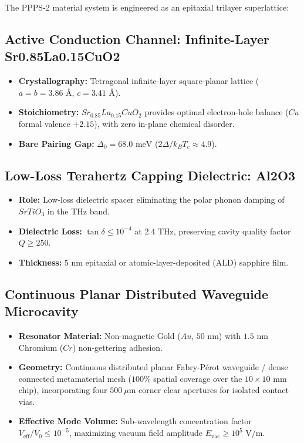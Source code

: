 \documentclass[10pt,twocolumn,letterpaper]{article}
\begin{document}
The PPPS-2 material system is engineered as an epitaxial trilayer superlattice:

\subsection{Active Conduction Channel: Infinite-Layer Sr0.85La0.15CuO2}
\begin{itemize}
    \item \textbf{Crystallography:} Tetragonal infinite-layer square-planar lattice ($a = b = 3.86\text{ \AA}$, $c = 3.41\text{ \AA}$).
    \item \textbf{Stoichiometry:} $Sr_{0.85}La_{0.15}CuO_2$ provides optimal electron-hole balance ($Cu$ formal valence $+2.15$), with zero in-plane chemical disorder.
    \item \textbf{Bare Pairing Gap:} $\Delta_0 = 68.0\text{ meV}$ ($2\Delta / k_B T_c \approx 4.9$).
\end{itemize}

\subsection{Low-Loss Terahertz Capping Dielectric: Al2O3}
\begin{itemize}
    \item \textbf{Role:} Low-loss dielectric spacer eliminating the polar phonon damping of $SrTiO_3$ in the THz band.
    \item \textbf{Dielectric Loss:} $\tan \delta \le 10^{-4}$ at $2.4\text{ THz}$, preserving cavity quality factor $Q \ge 250$.
    \item \textbf{Thickness:} $5\text{ nm}$ epitaxial or atomic-layer-deposited (ALD) sapphire film.
\end{itemize}

\subsection{Continuous Planar Distributed Waveguide Microcavity}
\begin{itemize}
    \item \textbf{Resonator Material:} Non-magnetic Gold ($Au$, $50\text{ nm}$) with $1.5\text{ nm}$ Chromium ($Cr$) non-gettering adhesion.
    \item \textbf{Geometry:} Continuous distributed planar Fabry-Pérot waveguide / dense connected metamaterial mesh ($100\%$ spatial coverage over the $10 \times 10\text{ mm}$ chip), incorporating four $500\ \mu\text{m}$ corner clear apertures for isolated contact vias.
    \item \textbf{Effective Mode Volume:} Sub-wavelength concentration factor $V_{\text{eff}} / V_0 \le 10^{-5}$, maximizing vacuum field amplitude $E_{\text{vac}} \ge 10^5\text{ V/m}$.
\end{itemize}
\end{document}
